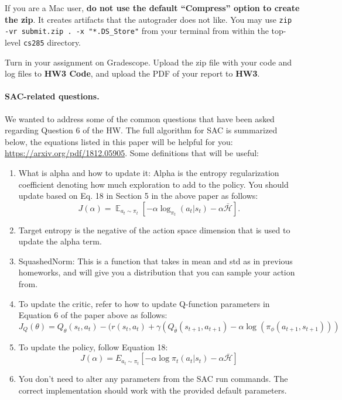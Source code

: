 If you are a Mac user, \textbf{do not use the default ``Compress'' option to create the zip}. It creates artifacts that the autograder does not like. You may use \texttt{zip -vr submit.zip . -x "*.DS\_Store"} from your terminal from within the top-level \verb|cs285| directory.

Turn in your assignment on Gradescope. Upload the zip file with your code and log files to \textbf{HW3 Code}, and upload the PDF of your report to \textbf{HW3}.

\newpage 

\paragraph{SAC-related questions.} 
We wanted to address some of the common questions that have been asked regarding Question 6 of the HW. The full algorithm for SAC is summarized below, the equations listed in this paper will be helpful for you: {\url{https://arxiv.org/pdf/1812.05905}}. Some definitions that will be useful:
\begin{enumerate}
    \item What is alpha and how to update it: Alpha is the entropy regularization coefficient denoting how much exploration to add to the policy. You should update based on Eq. 18 in Section 5 in the above paper as follows: 
    $$
    J(\alpha)=\mathop{\mathbb{E}}_{a_t \sim \pi_t}[-\alpha\log_{\pi_t}(a_t|s_t) - \alpha\bar{\mathcal{H}}].
    $$
    \item Target entropy is the negative of the action space dimension that is used to update the alpha term.
    \item SquashedNorm: This is a function that takes in mean and std as in previous homeworks, and will give you a distribution that you can sample your action from. 
    \item To update the critic, refer to how to update Q-function parameters in Equation 6 of the paper above as follows: \\
    $$J_{Q}(\theta) = Q_{\theta}(s_t, a_t) - (r(s_t, a_t) + \gamma (Q_{\bar{\theta}}(s_{t+1}, a_{t+1}) - \alpha \log(\pi_{\phi}(a_{t+1}, s_{t+1})))$$
    \item To update the policy, follow Equation 18: \\
    $$J(\alpha) = E_{a_t \sim \pi_t} [- \alpha \log \pi_{t}(a_t|s_t) - \alpha \bar{\mathcal{H}}]$$
    \item You don't need to alter any parameters from the SAC run commands. The correct implementation should work with the provided default parameters.
    
\end{enumerate}


